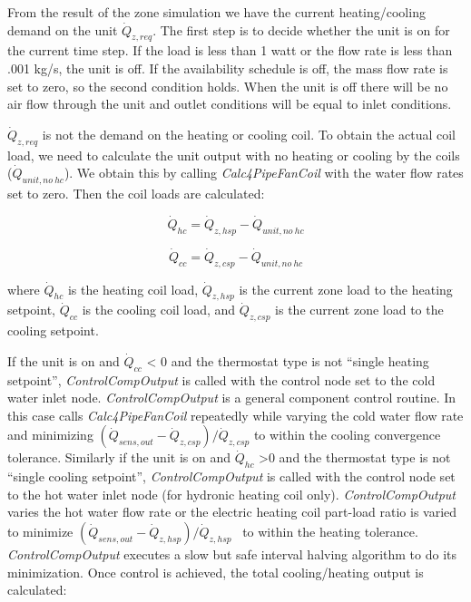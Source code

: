 From the result of the zone simulation we have the current heating/cooling demand on the unit \({\dot Q_{z,req}}\). The first step is to decide whether the unit is on for the current time step. If the load is less than 1 watt or the flow rate is less than .001 kg/s, the unit is off. If the availability schedule is off, the mass flow rate is set to zero, so the second condition holds. When the unit is off there will be no air flow through the unit and outlet conditions will be equal to inlet conditions.

\({\dot Q_{z,req}}\) is not the demand on the heating or cooling coil. To obtain the actual coil load, we need to calculate the unit output with no heating or cooling by the coils (\({\dot Q_{unit,no~hc}}\)). We obtain this by calling \emph{Calc4PipeFanCoil} with the water flow rates set to zero. Then the coil loads are calculated:

\begin{equation}
{\dot Q_{hc}} = {\dot Q_{z,hsp}} - {\dot Q_{unit,no~hc}}
\end{equation}

\begin{equation}
{\dot Q_{cc}} = {\dot Q_{z,csp}} - {\dot Q_{unit,no~hc}}
\end{equation}

where \({\dot Q_{hc}}\) is the heating coil load, \({\dot Q_{z,hsp}}\) is the current zone load to the heating setpoint, \({\dot Q_{cc}}\) is the cooling coil load, and \({\dot Q_{z,csp}}\) is the current zone load to the cooling setpoint.

If the unit is on and \({\dot Q_{cc}}\) \textless{} 0 and the thermostat type is not ``single heating setpoint'', \emph{ControlCompOutput} is called with the control node set to the cold water inlet node. \emph{ControlCompOutput} is a general component control routine. In this case calls \emph{Calc4PipeFanCoil} repeatedly while varying the cold water flow rate and minimizing \(({\dot Q_{sens,out}} - {\dot Q_{z,csp}})/{\dot Q_{z,csp}}\) to within the cooling convergence tolerance. Similarly if the unit is on and \({\dot Q_{hc}}\) \textgreater{}0 and the thermostat type is not ``single cooling setpoint'', \emph{ControlCompOutput} is called with the control node set to the hot water inlet node (for hydronic heating coil only). \emph{ControlCompOutput} varies the hot water flow rate or the electric heating coil part-load ratio is varied to minimize \(({\dot Q_{sens,out}} - {\dot Q_{z,hsp}})/{\dot Q_{z,hsp}}\) ~to within the heating tolerance. \emph{ControlCompOutput} executes a slow but safe interval halving algorithm to do its minimization. Once control is achieved, the total cooling/heating output is calculated:


